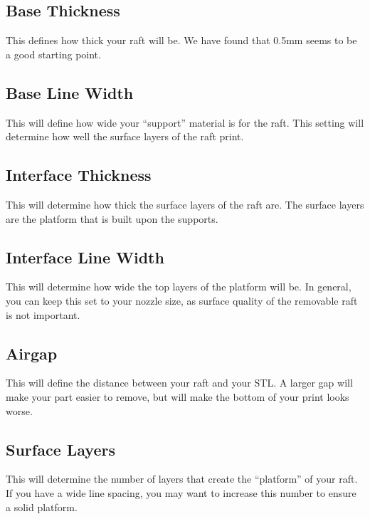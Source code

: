 \subsection{Base Thickness}

This defines how thick your raft will be. We have found that 0.5mm seems to be a good starting point.

\subsection{Base Line Width}

This will define how wide your “support” material is for the raft. This setting will determine how well the surface layers of the raft print.

\subsection{Interface Thickness}

This will determine how thick the surface layers of the raft are. The surface layers are the platform that is built upon the supports.

\subsection{Interface Line Width}

This will determine how wide the top layers of the platform will be. In general, you can keep this set to your nozzle size, as surface quality of the removable raft is not important.

\subsection{Airgap}

This will define the distance between your raft and your STL. A larger gap will make your part easier to remove, but will make the bottom of your print looks worse.

\subsection{Surface Layers}

This will determine the number of layers that create the “platform” of your raft. If you have a wide line spacing, you may want to increase this number to ensure a solid platform. 

